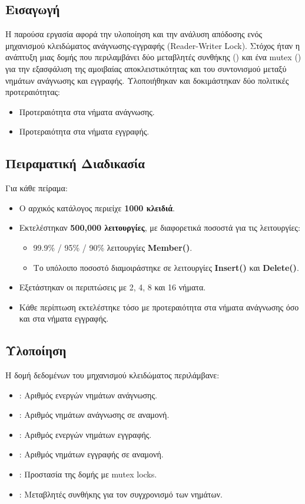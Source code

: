 \documentclass{article}
\begin{document}
\subsection*{Εισαγωγή}
Η παρούσα εργασία αφορά την υλοποίηση και την ανάλυση απόδοσης ενός μηχανισμού κλειδώματος ανάγνωσης-εγγραφής (Reader-Writer Lock). Στόχος ήταν η ανάπτυξη μιας δομής που περιλαμβάνει δύο μεταβλητές συνθήκης () και ένα mutex () για την εξασφάλιση της αμοιβαίας αποκλειστικότητας και του συντονισμού μεταξύ νημάτων ανάγνωσης και εγγραφής. Υλοποιήθηκαν και δοκιμάστηκαν δύο πολιτικές προτεραιότητας:
\begin{itemize}
    \item Προτεραιότητα στα νήματα ανάγνωσης.
    \item Προτεραιότητα στα νήματα εγγραφής.
\end{itemize}
\subsection*{Πειραματική Διαδικασία}
Για κάθε πείραμα:
\begin{itemize}
    \item Ο αρχικός κατάλογος περιείχε \textbf{1000 κλειδιά}.
    \item Εκτελέστηκαν \textbf{500,000 λειτουργίες}, με διαφορετικά ποσοστά για τις λειτουργίες:
    \begin{itemize}
        \item 99.9\% / 95\% / 90\% λειτουργίες \textbf{Member()}.
        \item Το υπόλοιπο ποσοστό διαμοιράστηκε σε λειτουργίες \textbf{Insert()} και \textbf{Delete()}.
    \end{itemize}
    \item Εξετάστηκαν οι περιπτώσεις με 2, 4, 8 και 16 νήματα.
    \item Κάθε περίπτωση εκτελέστηκε τόσο με προτεραιότητα στα νήματα ανάγνωσης όσο και στα νήματα εγγραφής.
\end{itemize}
\subsection*{Υλοποίηση}
Η δομή δεδομένων του μηχανισμού κλειδώματος περιλάμβανε:
\begin{itemize}
    \item {}: Αριθμός ενεργών νημάτων ανάγνωσης.
    \item {}: Αριθμός νημάτων ανάγνωσης σε αναμονή.
    \item {}: Αριθμός ενεργών νημάτων εγγραφής.
    \item {}: Αριθμός νημάτων εγγραφής σε αναμονή.
    \item {}: Προστασία της δομής με mutex locks.
    \item {}: Μεταβλητές συνθήκης για τον συγχρονισμό των νημάτων.
\end{itemize}
\end{document}
